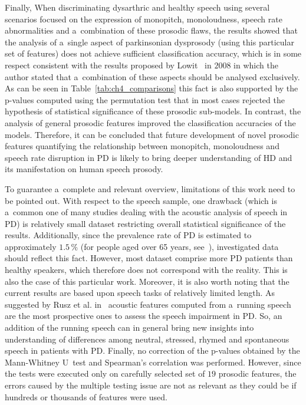 Finally, When discriminating dysarthric and healthy speech using several scenarios focused on the expression of monopitch, monoloudness, speech rate abnormalities and a~combination of these prosodic flaws, the results showed that the analysis of a~single aspect of parkinsonian dysprosody (using this particular set of features) does not achieve sufficient classification accuracy, which is in some respect consistent with the results proposed by Lowit~\cite{Lowit2008} in $2008$ in which the author stated that a~combination of these aspects should be analysed exclusively. As can be seen in Table~\ref{tab:ch4_comparisons} this fact is also supported by the p-values computed using the permutation test that in most cases rejected the hypothesis of statistical significance of these prosodic sub-models. In contrast, the analysis of general prosodic features improved the classification accuracies of the models. Therefore, it can be concluded that future development of novel prosodic features quantifying the relationship between monopitch, monoloudness and speech rate disruption in PD is likely to bring deeper understanding of HD and its manifestation on human speech prosody.

To guarantee a~complete and relevant overview, limitations of this work need to be pointed out. With respect to the speech sample, one drawback (which is a~common one of many studies dealing with the acoustic analysis of speech in PD) is relatively small dataset restricting overall statistical significance of the results. Additionally, since the prevalence rate of PD is estimated to approximately $1.5\,\%$ (for people aged over 65 years, see~\cite{Rijk1997}), investigated data should reflect this fact. However, most dataset comprise more PD patients than healthy speakers, which therefore does not correspond with the reality. This is also the case of this particular work. Moreover, it is also worth noting that the current results are based upon speech tasks of relatively limited length. As suggested by Rusz et al. in~\cite{Rusz2013, Rusz2013b} acoustic features computed from a~running speech are the most prospective ones to assess the speech impairment in PD. So, an addition of the running speech can in general bring new insights into understanding of differences among neutral, stressed, rhymed and spontaneous speech in patients with PD. Finally, no correction of the p-values obtained by the Mann-Whitney U~test and Spearman's correlation was performed. However, since the tests were executed only on carefully selected set of $19$ prosodic features, the errors caused by the multiple testing issue are not as relevant as they could be if hundreds or thousands of features were used.

